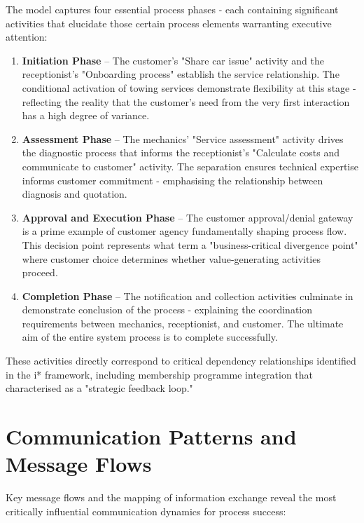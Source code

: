 \documentclass[14pt,a4paper]{article}
\begin{document}
The model captures four essential process phases - each containing significant activities that elucidate those certain process elements warranting executive attention:

\begin{enumerate}
    \item \textbf{Initiation Phase} – The customer's "Share car issue" activity and the receptionist's "Onboarding process" establish the service relationship. The conditional activation of towing services demonstrate flexibility at this stage - reflecting the reality that the customer's need from the very first interaction has a high degree of variance.

    \item \textbf{Assessment Phase} – The mechanics' "Service assessment" activity drives the diagnostic process that informs the receptionist's "Calculate costs and communicate to customer" activity. The separation ensures technical expertise informs customer commitment - emphasising the relationship between diagnosis and quotation.

    \item \textbf{Approval and Execution Phase} – The customer approval/denial gateway is a prime example of customer agency fundamentally shaping process flow. This decision point represents what \textit{\parencite[p. 185]{Allweyer2016}} term a "business-critical divergence point" where customer choice determines whether value-generating activities proceed.

    \item \textbf{Completion Phase} – The notification and collection activities culminate in demonstrate conclusion of the process - explaining the coordination requirements between mechanics, receptionist, and customer. The ultimate aim of the entire system process is to complete successfully.
\end{enumerate}

These activities directly correspond to critical dependency relationships identified in the i* framework, including membership programme integration that \textit{\parencite[p. 263]{Castro2018}} characterised as a "strategic feedback loop."

\section{Communication Patterns and Message Flows}

Key message flows and the mapping of information exchange reveal the most critically influential communication dynamics for process success:
\end{document}
